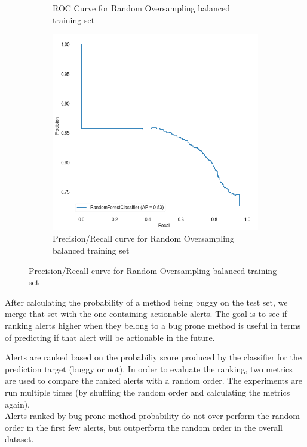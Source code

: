 \begin{figure}[H]
\begin{subfigure}{.5\textwidth}
		\caption{ROC Curve for Random Oversampling balanced training set}\label{}
	\end{subfigure}%
	\begin{subfigure}{.5\textwidth}
		\centering
		\includegraphics[scale=0.3]{./src/methodBug/methodbug_rover_pr.png}
		\caption{Precision/Recall curve for Random Oversampling balanced training set}\label{}
	\end{subfigure}  
\end{figure}


After calculating the probability of a method being buggy on the test set, we merge that set with the one containing actionable alerts. The goal is to see if ranking alerts higher when they belong to a bug prone method is useful in terms of predicting if that alert will be actionable in the future.

Alerts are ranked based on the probabiliy score produced by the classifier for the prediction target (buggy or not).
In order to evaluate the ranking, two metrics are used to compare the ranked alerts with a random order. The experiments are run multiple times (by shuffling the random order and calculating the metrics again).\\

Alerts ranked by bug-prone method probability do not over-perform the random order in the first few alerts, but outperform the random order in the overall dataset.

